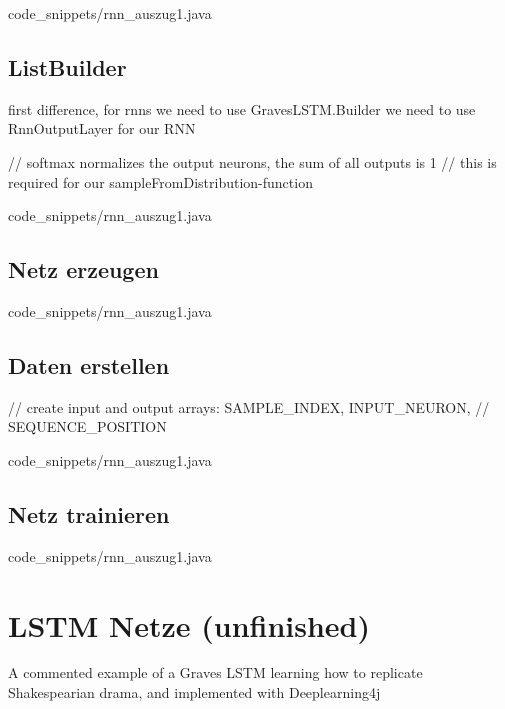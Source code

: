 {
{code_snippets/rnn_auszug1.java}

\subsection{ListBuilder}
first difference, for rnns we need to use GravesLSTM.Builder
we need to use RnnOutputLayer for our RNN

    // softmax normalizes the output neurons, the sum of all outputs is 1
    // this is required for our sampleFromDistribution-function


{code_snippets/rnn_auszug1.java}

\subsection{Netz erzeugen}

{code_snippets/rnn_auszug1.java}

\subsection{Daten erstellen}
// create input and output arrays: SAMPLE\_INDEX, INPUT\_NEURON,
    // SEQUENCE\_POSITION

{code_snippets/rnn_auszug1.java}

\subsection{Netz trainieren}

{code_snippets/rnn_auszug1.java}

\section{LSTM Netze (unfinished)}
A commented example of a Graves LSTM learning how to replicate Shakespearian drama, and implemented with Deeplearning4j
}
